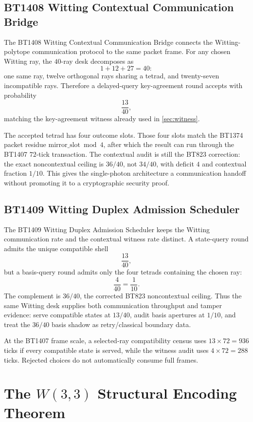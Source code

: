 ﻿\documentclass[12pt]{article}
\begin{document}
\subsection{BT1408 Witting Contextual Communication Bridge}

The BT1408 Witting Contextual Communication Bridge connects the
Witting-polytope communication protocol to the same packet frame.  For any
chosen Witting ray, the \(40\)-ray desk decomposes as
\[
1+12+27=40:
\]
one same ray, twelve orthogonal rays sharing a tetrad, and twenty-seven
incompatible rays.  Therefore a delayed-query key-agreement round accepts with
probability
\[
\frac{13}{40},
\]
matching the key-agreement witness already used in \cref{sec:witness}.

The accepted tetrad has four outcome slots.  Those four slots match the BT1374
packet residue \(\text{mirror\_slot}\bmod 4\), after which the result can run
through the BT1407 \(72\)-tick transaction.  The contextual audit is still the
BT823 correction: the exact noncontextual ceiling is \(36/40\), not \(34/40\),
with deficit \(4\) and contextual fraction \(1/10\).  This gives the
single-photon architecture a communication handoff without promoting it to a
cryptographic security proof.

\subsection{BT1409 Witting Duplex Admission Scheduler}

The BT1409 Witting Duplex Admission Scheduler keeps the Witting communication
rate and the contextual witness rate distinct.  A state-query round admits the
unique compatible shell
\[
\frac{13}{40},
\]
but a basis-query round admits only the four tetrads containing the chosen ray:
\[
\frac{4}{40}=\frac{1}{10}.
\]
The complement is \(36/40\), the corrected BT823 noncontextual ceiling.  Thus
the same Witting desk supplies both communication throughput and tamper evidence:
serve compatible states at \(13/40\), audit basis apertures at \(1/10\), and
treat the \(36/40\) basis shadow as retry/classical boundary data.

At the BT1407 frame scale, a selected-ray compatibility census uses
\(13\times72=936\) ticks if every compatible state is served, while the witness
audit uses \(4\times72=288\) ticks.  Rejected choices do not automatically
consume full frames.

\section{The \texorpdfstring{$W(3,3)$}{W(3,3)} Structural Encoding Theorem}
\label{sec:encoding}
\end{document}
